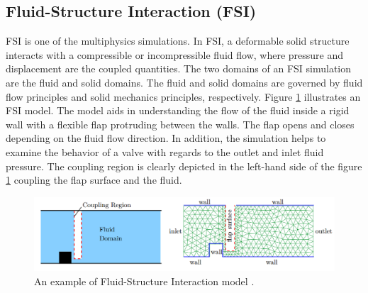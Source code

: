 
\subsection{Fluid-Structure Interaction (FSI)}

FSI is one of the multiphysics simulations. In FSI, a deformable solid structure interacts with a compressible or incompressible fluid flow, where pressure and displacement are the coupled quantities. The two domains of an FSI simulation are the fluid and solid domains. The fluid and solid domains are governed by fluid flow principles and solid mechanics principles, respectively. Figure \ref{Fig:Fluid-Structure-example} illustrates an FSI model. The model aids in understanding the flow of the fluid inside a rigid wall with a flexible flap protruding between the walls. The flap opens and closes depending on the fluid flow direction. In addition, the simulation helps to examine the behavior of a valve with regards to the outlet and inlet fluid pressure. The coupling region is clearly depicted in the left-hand side of the figure \ref{Fig:Fluid-Structure-example} coupling the flap surface and the fluid. 
\begin{figure}[!ht]
\centering
\includegraphics[width=\textwidth]{images/Fluid-Structure-example.png}
\captionsetup{justification=justified}
\caption[An example of Fluid-Structure Interaction model]{An example of Fluid-Structure Interaction model \cite{MpCCI_documentation}.}
\label{Fig:Fluid-Structure-example}
\end{figure}

